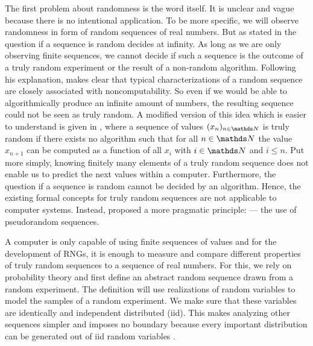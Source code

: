 \documentclass{stdlocal}
\begin{document}
    The first problem about randomness is the word itself.
    It is unclear and vague because there is no intentional application.
    To be more specific, we will observe randomness in form of random sequences of real numbers.
    But as stated in \textcite{volchan2002} the question if a sequence is random decides at infinity.
    As long as we are only observing finite sequences, we cannot decide if such a sequence is the outcome of a truly random experiment or the result of a non-random algorithm.
    Following his explanation, \citeauthor{volchan2002} makes clear that typical characterizations of a random sequence are closely associated with noncomputability.
    So even if we would be able to algorithmically produce an infinite amount of numbers, the resulting sequence could not be seen as truly random.
    A modified version of this idea which is easier to understand is given in \textcite{kneusel2018}, where a sequence of values $(x_n)_{n\in\setNatural}$ is truly random if there exists no algorithm such that for all $n\in\setNatural$ the value $x_{n+1}$ can be computed as a function of all $x_i$ with $i\in\setNatural$ and $i\leq n$.
    Put more simply, knowing finitely many elements of a truly random sequence does not enable us to predict the next values within a computer.
    Furthermore, the question if a sequence is random cannot be decided by an algorithm.
    Hence, the existing formal concepts for truly random sequences are not applicable to computer systems.
    Instead, \citeauthor{volchan2002} proposed a more pragmatic principle:  --- the use of pseudorandom sequences.

    A computer is only capable of using finite sequences of values and for the development of RNGs, it is enough to measure and compare different properties of truly random sequences to a sequence of real numbers.
    For this, we rely on probability theory and first define an abstract random sequence drawn from a random experiment.
    The definition will use realizations of random variables to model the samples of a random experiment.
    We make sure that these variables are identically and independent distributed (iid).
    This makes analyzing other sequences simpler and imposes no boundary because every important distribution can be generated out of iid random variables \autocite[\ppno~81-111]{kneusel2018}.
\end{document}
